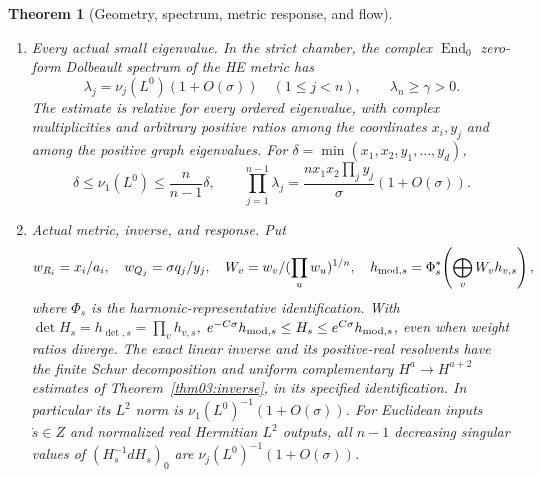 \documentclass[11pt]{amsart}
\newtheorem{theorem}{Theorem}[section]
\theoremstyle{definition}
\theoremstyle{remark}
\newcommand{\End}{\operatorname{End}}
\begin{document}
\begin{theorem}[Geometry, spectrum, metric response, and flow]
\begin{enumerate}
\item \emph{Every actual small eigenvalue.}
In the strict chamber, the complex \(\End_0\) zero-form Dolbeault
spectrum of the HE metric has
\begin{equation}\label{eq01:familyspectrum}
 \lambda_j=\nu_j(L^0)(1+O(\sigma))\quad(1\le j<n),\qquad
 \lambda_n\ge\gamma>0.
\end{equation}
The estimate is relative for every ordered eigenvalue, with complex
multiplicities and arbitrary positive ratios among the coordinates
\(x_i,y_j\) and among the positive graph eigenvalues.
For \(\delta=\min(x_1,x_2,y_1,\ldots,y_d)\),
\[
 \delta\le\nu_1(L^0)\le\frac n{n-1}\delta,\qquad
 \prod_{j=1}^{n-1}\lambda_j
       =\frac{n x_1x_2\prod_jy_j}{\sigma}(1+O(\sigma)).
\]

\item \emph{Actual metric, inverse, and response.}
Put
\begin{equation}\label{eq01:metricweights}
 w_{R_i}=x_i/a_i,\quad w_{Q_j}=\sigma q_j/y_j,\quad
 W_v=w_v/(\prod_uw_u)^{1/n},\quad
 h_{{\rm mod},s}=\Phi_s^*\!\left(\bigoplus_vW_vh_{v,s}\right),
\end{equation}
where \(\Phi_s\) is the harmonic-representative identification.
With \(\det H_s=h_{\det,s}=\prod_vh_{v,s}\),
\(e^{-C\sigma}h_{{\rm mod},s}\le H_s\le e^{C\sigma}h_{{\rm mod},s}\),
even when weight ratios diverge. The exact linear inverse and its
positive-real resolvents have the finite Schur decomposition and
uniform complementary \(H^a\to H^{a+2}\) estimates of
Theorem~\ref{thm03:inverse}, in its specified identification.
In particular its \(L^2\) norm is
\(\nu_1(L^0)^{-1}(1+O(\sigma))\). For Euclidean inputs
\(\dot s\in Z\) and normalized real Hermitian \(L^2\) outputs,
all \(n-1\) decreasing singular values of \((H_s^{-1}dH_s)_0\)
are \(\nu_j(L^0)^{-1}(1+O(\sigma))\).


\end{enumerate}
\end{theorem}
\end{document}
